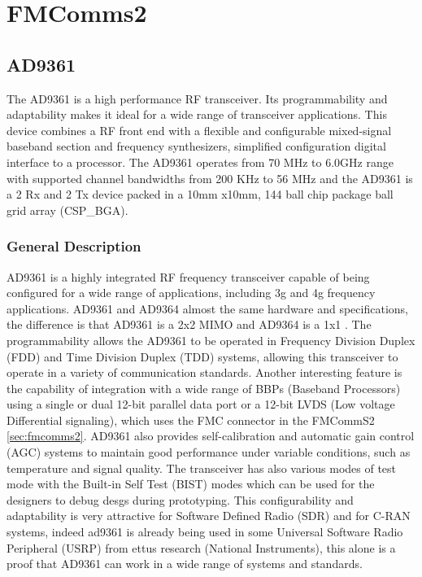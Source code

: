 \chapter{FMComms2}
\section{AD9361}
\label{sec:ad9361}

The AD9361 is a high performance RF transceiver. Its programmability and adaptability makes it ideal for a wide range of transceiver applications. This device combines a RF front end with a flexible and configurable mixed-signal baseband section and frequency synthesizers, simplified configuration digital interface to a processor. 
The AD9361 operates from 70 MHz to 6.0GHz range with supported channel bandwidths from 200 KHz to 56 MHz and the AD9361 is a 2 Rx and 2 Tx device packed in a 10mm x10mm, 144 ball chip package ball grid array (CSP\_BGA).

\subsection{General Description}

AD9361 is a highly integrated RF frequency transceiver capable of being configured for a wide range of applications, including 3g and 4g frequency applications. AD9361 and AD9364 almost the same hardware and specifications, the difference is that AD9361 is a 2x2 MIMO and AD9364 is a 1x1 \cite{ad9361_wiki}.
The programmability allows the AD9361 to be operated in Frequency Division Duplex (FDD) and Time Division Duplex (TDD) systems, allowing this transceiver to operate in a variety of communication standards. Another interesting feature is the capability of integration with a wide range of BBPs (Baseband Processors) using a single or dual 12-bit parallel data port or a 12-bit LVDS (Low voltage Differential signaling), which uses the FMC connector in the FMCommS2 \ref{sec:fmcomms2}.
AD9361 also provides self-calibration and automatic gain control (AGC) systems to maintain good performance under variable conditions, such as temperature and signal quality. The transceiver has also various modes of test mode with the Built-in Self Test (BIST) modes which can be used for the designers to debug desgs during prototyping.
This configurability and adaptability is very attractive for Software Defined Radio (SDR) and for C-RAN systems, indeed ad9361 is already being used in some Universal Software Radio Peripheral (USRP) from ettus research (National Instruments), this alone is a proof that AD9361 can work in a wide range of systems and standards.

